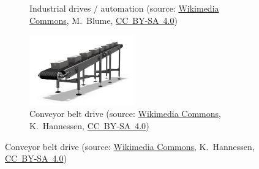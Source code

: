 \begin{frame}[c]
\begin{figure}
\begin{subfigure}[b]{0.49\textwidth}
			\caption{Industrial drives / automation (source: \href{https://de.m.wikipedia.org/wiki/Datei:Paris_Motor_Show_2018,_Paris_\%281Y7A1752\%29.jpg}{Wikimedia Commons}, M.~Blume, \href{https://creativecommons.org/licenses/by-sa/4.0/deed.de}{CC~BY-SA~4.0})}
		\end{subfigure}
		\pause
		\hfill
		\begin{subfigure}[b]{0.49\textwidth}
			\centering
			\includegraphics[width=0.5\textwidth]{fig/lec01/Conveyor.jpg}
			\caption{Conveyor belt drive (source: \href{https://commons.wikimedia.org/wiki/File:Inclined-belt_conveyor.jpgg}{Wikimedia Commons},  	K.~Hannessen, \href{https://creativecommons.org/licenses/by-sa/4.0/deed.en}{CC~BY-SA~4.0})}
		\end{subfigure}
	\end{figure}
\end{frame}

